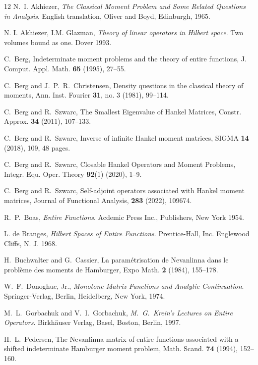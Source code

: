 \documentclass [12pt]{article}
\begin{document}
\begin{thebibliography}{12}
  N.~I. Akhiezer,  {\it The Classical Moment Problem and Some Related
 Questions in Analysis}. English translation, Oliver and Boyd, Edinburgh,
 1965.

 N. I. Akhiezer, I.M. Glazman, {\it Theory of linear operators in Hilbert space}.
Two volumes bound as one. Dover 1993.

 C.~Berg, Indeterminate moment problems  and the theory of entire functions, J. Comput. Appl. Math. {\bf 65} (1995), 27--55.

 C.~Berg and J.~P.~R.~Christensen,   Density questions in the classical theory of moments,  Ann. Inst. Fourier  {\bf 31}, no. 3 (1981), 99--114.

 C.~Berg and R.~Szwarc,  The Smallest Eigenvalue of Hankel Matrices, Constr. Approx. {\bf 34} (2011), 107--133.

 C.~Berg and R.~Szwarc,  Inverse of infinite Hankel moment matrices, SIGMA {\bf 14} (2018), 109, 48 pages.

 C.~Berg and R.~Szwarc,  Closable Hankel Operators and Moment Problems,
Integr. Equ. Oper. Theory {\bf 92}(1) (2020), 1--9.

 C.~Berg and R.~Szwarc, Self-adjoint operators associated with Hankel moment matrices, Journal of Functional Analysis, {\bf 283} (2022), 109674. 

 R.~P.~Boas, {\it Entire Functions}. Acdemic Press Inc., Publishers, New York  1954.

 L. de Branges, {\it Hilbert Spaces of Entire Functions}. Prentice-Hall, Inc. Englewood Cliffs, N. J. 1968.

 H.~Buchwalter and G.~Cassier, La param\'etrisation de Nevanlinna dans le probl{\`e}me des moments de Hamburger, Expo Math. {\bf 2} (1984), 155--178.

 W.~F.~Donoghue, Jr., {\it Monotone  Matrix Functions and Analytic Continuation}. Springer-Verlag, Berlin, Heidelberg, New York, 1974.

 M.~L.~Gorbachuk and V.~I.~Gorbachuk, {\it M.~G.~Krein's Lectures on Entire Operators}. Birkh\"{a}user Verlag,  Basel, Boston, Berlin, 1997.

 H.~L.~Pedersen, The Nevanlinna matrix of entire functions associated with a shifted indeterminate Hamburger moment problem, Math. Scand. {\bf 74} (1994), 152--160.


\end{thebibliography}
\end{document}
